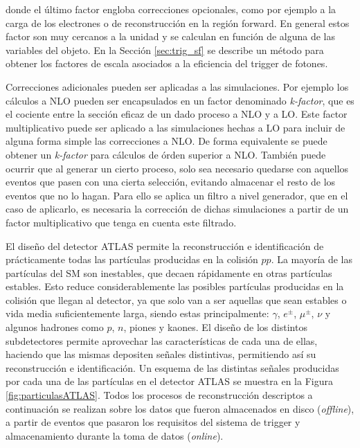 donde el último factor engloba correcciones opcionales, como por ejemplo a la carga de los electrones o de reconstrucción en la región forward. En general estos factor son muy cercanos a la unidad y se calculan en función de alguna de las variables del objeto. En la Sección \ref{sec:trig_sf} se describe un método para obtener los factores de escala asociados a la eficiencia del trigger de fotones.

Correcciones adicionales pueden ser aplicadas a las simulaciones. Por ejemplo los cálculos a NLO pueden ser encapsulados en un factor denominado \textit{k-factor}, que es el cociente entre la sección eficaz de un dado proceso a NLO y a LO. Este factor multiplicativo puede ser aplicado a las simulaciones hechas a LO para incluir de alguna forma simple las correcciones a NLO. De forma equivalente se puede obtener un \textit{k-factor} para cálculos de órden superior a NLO. También  puede ocurrir que al generar un cierto proceso, solo sea necesario quedarse con aquellos eventos que pasen con una cierta selección, evitando almacenar el resto de los eventos que no lo hagan. Para ello se aplica un filtro a nivel generador, que en el caso de aplicarlo, es necesaria la corrección de dichas simulaciones a partir de un factor multiplicativo que tenga en cuenta este filtrado.




El diseño del detector ATLAS permite la reconstrucción e identificación de prácticamente todas las
partículas producidas en la colisión $pp$. 
La mayoría de las partículas del SM son inestables, que decaen rápidamente en otras partículas estables. Esto reduce considerablemente las posibles partículas producidas en la colisión que llegan al detector, ya que solo van a ser aquellas que sean estables o vida media suficientemente larga, siendo estas principalmente: $\gamma$, $e^{\pm}$, $\mu^{\pm}$, $\nu$ y algunos hadrones
como $p$, $n$, piones y kaones. El diseño de los distintos subdetectores permite aprovechar las
características de cada una de ellas, haciendo que las mismas depositen señales distintivas, permitiendo así su reconstrucción e identificación. Un esquema de las distintas señales producidas por cada una de las partículas en el detector ATLAS se muestra en la Figura \ref{fig:particulasATLAS}. Todos los procesos de reconstrucción descriptos a continuación se realizan sobre los datos que fueron almacenados en disco (\textit{offline}), a partir de eventos que pasaron los requisitos del sistema de trigger y almacenamiento durante la toma de datos (\textit{online}).


